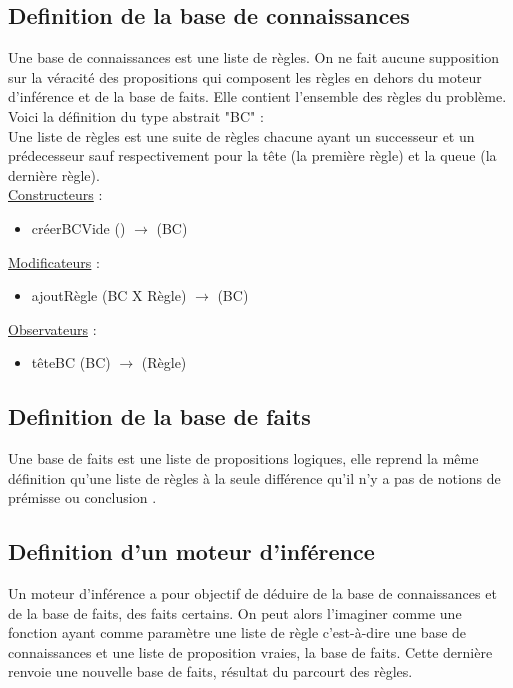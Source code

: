 \documentclass{article}
\begin{document}
\subsection{Definition de la base de connaissances}
Une base de connaissances est une liste de règles. On ne fait aucune supposition sur la véracité des propositions qui  composent les règles en dehors du moteur d'inférence et de la base de faits.
Elle contient l'ensemble des règles du problème.
\\Voici la définition du type abstrait "BC" : \\
Une liste de règles est une suite de règles chacune ayant un successeur et un prédecesseur sauf respectivement pour la tête (la première règle) et la queue (la dernière règle).\\
\underline{Constructeurs} : 

\begin{itemize}
    \item créerBCVide () $\longrightarrow$ (BC)\\
\end{itemize}

\underline{Modificateurs} :
\begin{itemize}
    \item ajoutRègle (BC X Règle) $\longrightarrow$ (BC)\\
\end{itemize}
\underline{Observateurs} : 
\begin{itemize}
    \item têteBC (BC) $\longrightarrow$ (Règle)\\
\end{itemize}

\subsection{Definition de la base de faits}
Une base de faits est une liste de propositions logiques, elle reprend la même définition qu'une liste de règles à la seule différence qu'il n'y a pas de notions de prémisse ou conclusion .

\subsection{Definition d'un moteur d'inférence}
Un moteur d'inférence a pour objectif de déduire de la base de connaissances et de la base de faits, des faits certains.
On peut alors l'imaginer comme une fonction ayant comme paramètre une liste de règle c'est-à-dire une base de connaissances et une liste de proposition vraies, la base de faits.
Cette dernière renvoie  une nouvelle base de faits, résultat du parcourt des règles.
\end{document}
